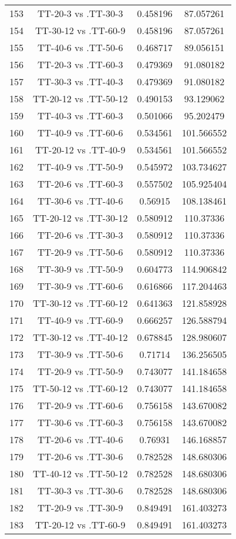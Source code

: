 \documentclass[a4paper,10pt]{article}
\begin{document}
\begin{landscape}
\begin{table}[!htp]
\begin{tabular}{cccc}
153&TT-20-3 vs .TT-30-3&0.458196&87.057261\\
154&TT-30-12 vs .TT-60-9&0.458196&87.057261\\
155&TT-40-6 vs .TT-50-6&0.468717&89.056151\\
156&TT-20-3 vs .TT-60-3&0.479369&91.080182\\
157&TT-30-3 vs .TT-40-3&0.479369&91.080182\\
158&TT-20-12 vs .TT-50-12&0.490153&93.129062\\
159&TT-40-3 vs .TT-60-3&0.501066&95.202479\\
160&TT-40-9 vs .TT-60-6&0.534561&101.566552\\
161&TT-20-12 vs .TT-40-9&0.534561&101.566552\\
162&TT-40-9 vs .TT-50-9&0.545972&103.734627\\
163&TT-20-6 vs .TT-60-3&0.557502&105.925404\\
164&TT-30-6 vs .TT-40-6&0.56915&108.138461\\
165&TT-20-12 vs .TT-30-12&0.580912&110.37336\\
166&TT-20-6 vs .TT-30-3&0.580912&110.37336\\
167&TT-20-9 vs .TT-50-6&0.580912&110.37336\\
168&TT-30-9 vs .TT-50-9&0.604773&114.906842\\
169&TT-30-9 vs .TT-60-6&0.616866&117.204463\\
170&TT-30-12 vs .TT-60-12&0.641363&121.858928\\
171&TT-40-9 vs .TT-60-9&0.666257&126.588794\\
172&TT-30-12 vs .TT-40-12&0.678845&128.980607\\
173&TT-30-9 vs .TT-50-6&0.71714&136.256505\\
174&TT-20-9 vs .TT-50-9&0.743077&141.184658\\
175&TT-50-12 vs .TT-60-12&0.743077&141.184658\\
176&TT-20-9 vs .TT-60-6&0.756158&143.670082\\
177&TT-30-6 vs .TT-60-3&0.756158&143.670082\\
178&TT-20-6 vs .TT-40-6&0.76931&146.168857\\
179&TT-20-6 vs .TT-30-6&0.782528&148.680306\\
180&TT-40-12 vs .TT-50-12&0.782528&148.680306\\
181&TT-30-3 vs .TT-30-6&0.782528&148.680306\\
182&TT-20-9 vs .TT-30-9&0.849491&161.403273\\
183&TT-20-12 vs .TT-60-9&0.849491&161.403273\\

\end{tabular}
\end{table}
\end{landscape}
\end{document}

